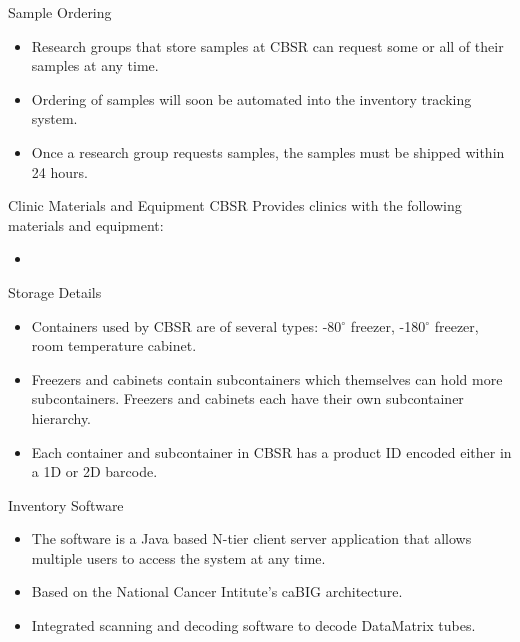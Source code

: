 \documentclass[hyperref={pdfpagelabels=false}]{beamer}
\begin{document}
\begin{frame}{Sample Ordering}
  \begin{itemize}
    \item Research groups that store samples at CBSR can request some or all of
      their samples at any time.
    \item Ordering of samples will soon be automated into the inventory
      tracking system.
    \item Once a research group requests samples, the samples must be shipped
      within 24 hours.
  \end{itemize}
\end{frame}

\begin{frame}{Clinic Materials and Equipment}{}
  CBSR Provides clinics with the following materials and equipment:
  \begin{itemize}
  \item
  \end{itemize}
\end{frame}

\begin{frame}{Storage Details}{}
  \begin{itemize}
  \item Containers used by CBSR are of several types: -80$^\circ$ freezer,
    -180$^\circ$ freezer, room temperature cabinet.
  \item Freezers and cabinets contain subcontainers which themselves can hold
    more subcontainers. Freezers and cabinets each have their own
    subcontainer hierarchy.
  \item Each container and subcontainer in CBSR has a product ID encoded either
    in a 1D or 2D barcode.
  \end{itemize}
\end{frame}

\begin{frame}{Inventory Software}
  \begin{itemize}
  \item The software is a Java based N-tier client server application that
    allows multiple users to access the system at any time.
  \item Based on the National Cancer Intitute's caBIG architecture.
  \item Integrated scanning and decoding software to decode DataMatrix tubes.
  \end{itemize}
\end{frame}
\end{document}
